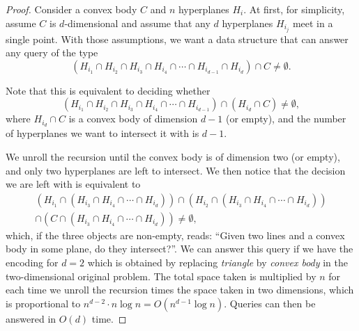 \begin{proof}
  Consider a convex body \(C\) and \(n\) hyperplanes \(H_i\).
  At first, for simplicity, assume \(C\) is \(d\)-dimensional and
  assume that any \(d\) hyperplanes \(H_{i_j}\) meet in a single point.
  With those assumptions,
  we want a data structure that can answer any query of the type
  \begin{displaymath}
    (H_{i_1} \cap H_{i_2} \cap H_{i_3} \cap H_{i_4} \cap \cdots \cap
    H_{i_{d-1}} \cap H_{i_d})
    \cap C
    \neq \emptyset.
  \end{displaymath}

  Note that this is equivalent to deciding whether
  \begin{displaymath}
    (H_{i_1} \cap H_{i_2} \cap H_{i_3} \cap H_{i_4} \cap \cdots \cap H_{i_{d-1}})
    \cap (H_{i_d} \cap C)
    \neq \emptyset,
  \end{displaymath}
  where \(H_{i_d} \cap C\) is a convex body of dimension \(d-1\) (or empty), and the
  number of hyperplanes we want to intersect it with is \(d-1\).

  We unroll the recursion until the convex body is of dimension two (or empty),
  and only two hyperplanes are left to intersect. We then notice that the decision we
  are left with is equivalent to
  \begin{multline*}
    (H_{i_1} \cap (H_{i_3} \cap H_{i_4} \cap \cdots \cap H_{i_d}))
    \cap
    (H_{i_2} \cap (H_{i_3} \cap H_{i_4} \cap \cdots \cap H_{i_d}))\\
    \cap (C \cap (H_{i_3} \cap H_{i_4} \cap \cdots \cap H_{i_d}))
    \neq \emptyset,
  \end{multline*}
  which, if the three objects are non-empty, reads:
  ``Given two lines and a convex body in some plane, do they intersect?''.
  We can answer this query if we have the encoding for \(d = 2\) which is
  obtained by replacing \emph{triangle} by \emph{convex body} in the
  two-dimensional original problem. The total space taken is multiplied by
  \(n\) for each time we unroll the recursion times the space taken in two
  dimensions, which is proportional to \(n^{d-2} \cdot n \log{n} = O(n^{d-1} \log{n}) \).
  Queries can then be answered in \(O(d)\) time.


\end{proof}
